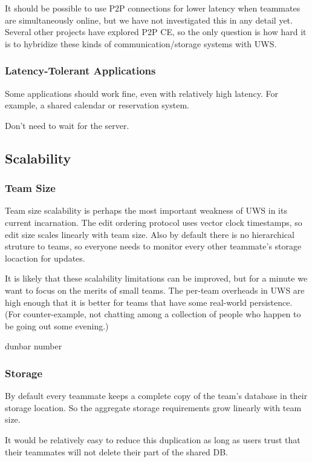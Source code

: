 \documentclass{article}
\begin{document}
It should be possible to use P2P connections for lower latency when teammates are simultaneously online, but we have not investigated this in any detail yet.
Several other projects have explored P2P CE, so the only question is how hard it is to hybridize these kinds of communication/storage systems with UWS.

\subsubsection{Latency-Tolerant Applications}

Some applications should work fine, even with relatively high latency.
For example, a shared calendar or reservation system.

Don't need to wait for the server.

\subsection{Scalability}

\subsubsection{Team Size}

Team size scalability is perhaps the most important weakness of UWS in its current incarnation.
The edit ordering protocol uses vector clock timestamps, so edit size scales linearly with team size.
Also by default there is no hierarchical struture to teams, so everyone needs to monitor every other teammate's storage locaction for updates.

It is likely that these scalability limitations can be improved, but for a minute we want to focus on the merits of small teams.
The per-team overheads in UWS are high enough that it is better for teams that have some real-world persistence.
(For counter-example, not chatting among a collection of people who happen to be going out some evening.)

dunbar number

\subsubsection{Storage}

By default every teammate keeps a complete copy of the team's database in their storage location.
So the aggregate storage requirements grow linearly with team size.

It would be relatively easy to reduce this duplication as long as users trust that their teammates will not delete their part of the shared DB.
\end{document}
